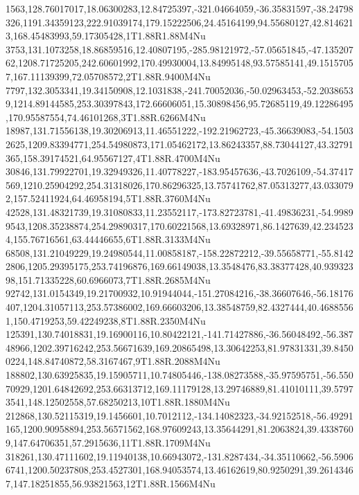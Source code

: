 1563,128.76017017,18.06300283,12.84725397,-321.04664059,-36.35831597,-38.24798326,1191.34359123,222.91039174,179.15222506,24.45164199,94.55680127,42.8146213,168.45483993,59.17305428,1T1.88R1.88M4Nu
3753,131.1073258,18.86859516,12.40807195,-285.98121972,-57.05651845,-47.13520762,1208.71725205,242.60601992,170.49930004,13.84995148,93.57585141,49.15157057,167.11139399,72.05708572,2T1.88R.9400M4Nu
7797,132.3053341,19.34150908,12.1031838,-241.70052036,-50.02963453,-52.20386539,1214.89144585,253.30397843,172.66606051,15.30898456,95.72685119,49.12286495,170.95587554,74.46101268,3T1.88R.6266M4Nu
18987,131.71556138,19.30206913,11.46551222,-192.21962723,-45.36639083,-54.15032625,1209.83394771,254.54980873,171.05462172,13.86243357,88.73044127,43.32791365,158.39174521,64.95567127,4T1.88R.4700M4Nu
30846,131.79922701,19.32949326,11.40778227,-183.95457636,-43.7026109,-54.37417569,1210.25904292,254.31318026,170.86296325,13.75741762,87.05313277,43.0330792,157.52411924,64.46958194,5T1.88R.3760M4Nu
42528,131.48321739,19.31080833,11.23552117,-173.82723781,-41.49836231,-54.99899543,1208.35238874,254.29890317,170.60221568,13.69328971,86.1427639,42.2345234,155.76716561,63.44446655,6T1.88R.3133M4Nu
68508,131.21049229,19.24980544,11.00858187,-158.22872212,-39.55658771,-55.81422806,1205.29395175,253.74196876,169.66149038,13.3548476,83.38377428,40.93932398,151.71335228,60.6966073,7T1.88R.2685M4Nu
92742,131.0154349,19.21700932,10.91944044,-151.27084216,-38.36607646,-56.18176407,1204.31057113,253.57386002,169.66603206,13.38548759,82.4327444,40.46885561,150.4719253,59.42249238,8T1.88R.2350M4Nu
125391,130.74018831,19.16900116,10.80422121,-141.71427886,-36.56048492,-56.38748966,1202.39716242,253.56671639,169.20865498,13.30642253,81.97831331,39.84500224,148.84740872,58.3167467,9T1.88R.2088M4Nu
188802,130.63925835,19.15905711,10.74805446,-138.08273588,-35.97595751,-56.55070929,1201.64842692,253.66313712,169.11179128,13.29746889,81.41010111,39.57973541,148.12502558,57.68250213,10T1.88R.1880M4Nu
212868,130.52115319,19.1456601,10.7012112,-134.14082323,-34.92152518,-56.49291165,1200.90958894,253.56571562,168.97609243,13.35644291,81.2063824,39.43387609,147.64706351,57.2915636,11T1.88R.1709M4Nu
318261,130.47111602,19.11940138,10.66943072,-131.8287434,-34.35110662,-56.59066741,1200.50237808,253.4527301,168.94053574,13.46162619,80.9250291,39.26143467,147.18251855,56.93821563,12T1.88R.1566M4Nu
